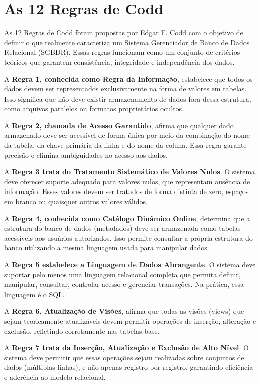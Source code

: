 \section{As 12 Regras de Codd}

As 12 Regras de Codd foram propostas por Edgar F. Codd com o objetivo de definir o que realmente caracteriza um Sistema Gerenciador de Banco de Dados Relacional (SGBDR). Essas regras funcionam como um conjunto de critérios teóricos que garantem consistência, integridade e independência dos dados.

A \textbf{Regra 1, conhecida como Regra da Informação}, estabelece que todos os dados devem ser representados exclusivamente na forma de valores em tabelas. Isso significa que não deve existir armazenamento de dados fora dessa estrutura, como arquivos paralelos ou formatos proprietários ocultos.

A \textbf{Regra 2, chamada de Acesso Garantido}, afirma que qualquer dado armazenado deve ser acessível de forma única por meio da combinação do nome da tabela, da chave primária da linha e do nome da coluna. Essa regra garante precisão e elimina ambiguidades no acesso aos dados.

A \textbf{Regra 3 trata do Tratamento Sistemático de Valores Nulos}. O sistema deve oferecer suporte adequado para valores nulos, que representam ausência de informação. Esses valores devem ser tratados de forma distinta de zero, espaços em branco ou quaisquer outros valores válidos.

A \textbf{Regra 4, conhecida como Catálogo Dinâmico Online}, determina que a estrutura do banco de dados (metadados) deve ser armazenada como tabelas acessíveis aos usuários autorizados. Isso permite consultar a própria estrutura do banco utilizando a mesma linguagem usada para manipular dados.

A \textbf{Regra 5 estabelece a Linguagem de Dados Abrangente}. O sistema deve suportar pelo menos uma linguagem relacional completa que permita definir, manipular, consultar, controlar acesso e gerenciar transações. Na prática, essa linguagem é o SQL.

A \textbf{Regra 6, Atualização de Visões}, afirma que todas as visões (views) que sejam teoricamente atualizáveis devem permitir operações de inserção, alteração e exclusão, refletindo corretamente nas tabelas base.

A \textbf{Regra 7 trata da Inserção, Atualização e Exclusão de Alto Nível}. O sistema deve permitir que essas operações sejam realizadas sobre conjuntos de dados (múltiplas linhas), e não apenas registro por registro, garantindo eficiência e aderência ao modelo relacional.

